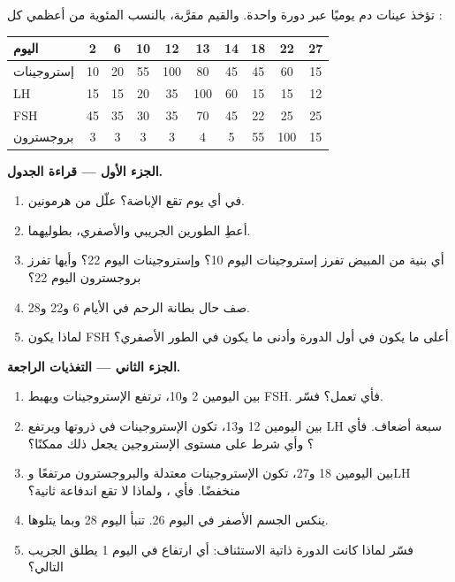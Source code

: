 \begin{problem}
\label{pb:g11:hormones-and-reproduction:1}
تؤخذ عينات دم يوميًا عبر دورة واحدة. والقيم مقرَّبة، بالنسب المئوية من
أعظمي كل :

\begin{center}
\begin{tabular}{lccccccccc}
اليوم & 2 & 6 & 10 & 12 & 13 & 14 & 18 & 22 & 27 \\ \hline
إستروجينات & 10 & 20 & 55 & 100 & 80 & 45 & 45 & 60 & 15 \\
LH & 15 & 15 & 20 & 35 & 100 & 60 & 15 & 15 & 12 \\
FSH & 45 & 35 & 30 & 35 & 70 & 45 & 22 & 25 & 25 \\
بروجسترون & 3 & 3 & 3 & 3 & 4 & 5 & 55 & 100 & 15 \\
\end{tabular}
\end{center}

\medskip
\noindent\textbf{الجزء الأول --- قراءة الجدول.}
\begin{enumerate}
  \item في أي يوم تقع الإباضة؟ علّل من هرمونين.
  \item أعطِ الطورين الجريبي والأصفري، بطوليهما.
  \item أي بنية من المبيض تفرز إستروجينات اليوم 10؟ وإستروجينات اليوم
        22؟ وأيها تفرز بروجسترون اليوم 22؟
  \item صف حال بطانة الرحم في الأيام 6 و22 و28.
  \item لماذا يكون FSH أعلى ما يكون في أول الدورة وأدنى ما يكون في
        الطور الأصفري؟
\end{enumerate}

\medskip
\noindent\textbf{الجزء الثاني --- التغذيات الراجعة.}
\begin{enumerate}[resume]
  \item بين اليومين 2 و10، ترتفع الإستروجينات ويهبط FSH. فأي  تعمل؟ فسّر.
  \item بين اليومين 12 و13، تكون الإستروجينات في ذروتها ويرتفع LH سبعة
        أضعاف. فأي ؟ وأي شرط على مستوى الإستروجين يجعل ذلك
        ممكنًا؟
  \item بين اليومين 18 و27، تكون الإستروجينات معتدلة والبروجسترون
        مرتفعًا وLH منخفضًا. فأي ، ولماذا لا تقع اندفاعة
        ثانية؟
  \item ينكس الجسم الأصفر في اليوم 26. تنبأ  اليوم 28 وبما
        يتلوها.
  \item فسّر لماذا كانت الدورة ذاتية الاستئناف: أي ارتفاع في اليوم 1
        يطلق الجريب التالي؟
\end{enumerate}


\end{problem}
